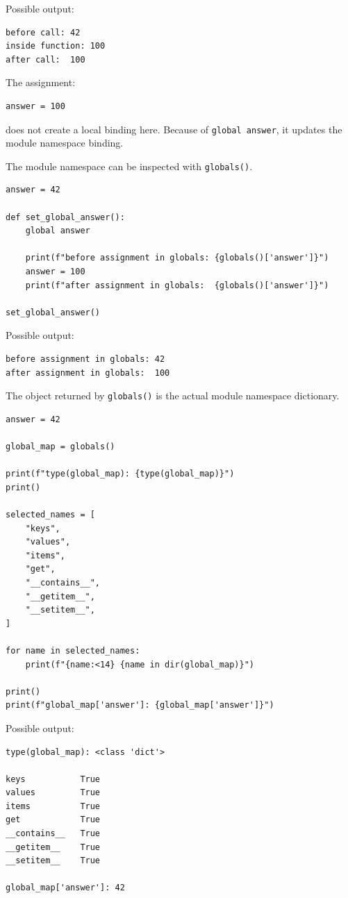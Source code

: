 Possible output:

\begin{verbatim}
before call: 42
inside function: 100
after call:  100
\end{verbatim}

The assignment:

\begin{verbatim}
answer = 100
\end{verbatim}

does not create a local binding here. Because of \texttt{global answer}, it updates the module namespace binding.

The module namespace can be inspected with \texttt{globals()}.

\begin{verbatim}
answer = 42

def set_global_answer():
    global answer

    print(f"before assignment in globals: {globals()['answer']}")
    answer = 100
    print(f"after assignment in globals:  {globals()['answer']}")

set_global_answer()
\end{verbatim}

Possible output:

\begin{verbatim}
before assignment in globals: 42
after assignment in globals:  100
\end{verbatim}

The object returned by \texttt{globals()} is the actual module namespace dictionary.

\begin{verbatim}
answer = 42

global_map = globals()

print(f"type(global_map): {type(global_map)}")
print()

selected_names = [
    "keys",
    "values",
    "items",
    "get",
    "__contains__",
    "__getitem__",
    "__setitem__",
]

for name in selected_names:
    print(f"{name:<14} {name in dir(global_map)}")

print()
print(f"global_map['answer']: {global_map['answer']}")
\end{verbatim}

Possible output:

\begin{verbatim}
type(global_map): <class 'dict'>

keys           True
values         True
items          True
get            True
__contains__   True
__getitem__    True
__setitem__    True

global_map['answer']: 42
\end{verbatim}

